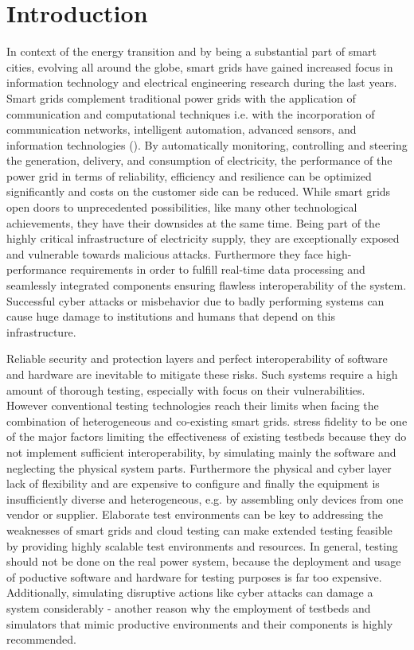 \section{Introduction}
In context of the energy transition and by being a substantial part of smart cities, evolving all around the globe, smart grids have gained increased focus in information technology and electrical engineering research during the last years. Smart grids complement traditional power grids with the application of communication and computational techniques \cite{talaat2020hybrid} i.e. with the incorporation of communication networks, intelligent automation, advanced sensors, and information technologies (\cite{smadi2021comprehensive}). By automatically monitoring, controlling and steering the generation, delivery, and consumption of electricity, the performance of the power grid in terms of reliability, efficiency and resilience can be optimized significantly and costs on the customer side can be reduced. While smart grids open doors to unprecedented possibilities, like many other technological achievements, they have their downsides at the same time. Being part of the highly critical infrastructure of electricity supply, they are exceptionally exposed and vulnerable towards malicious attacks. Furthermore they face high-performance requirements in order to fulfill real-time data processing and seamlessly integrated components ensuring flawless interoperability of the system. Successful cyber attacks or misbehavior due to badly performing systems can cause huge damage to institutions and humans that depend on this infrastructure.

Reliable security and protection layers and perfect interoperability of software and hardware are inevitable to mitigate these risks. Such systems require a high amount of thorough testing, especially with focus on their vulnerabilities. However conventional testing technologies reach their limits when facing the combination of heterogeneous and co-existing smart grids. \citeauthor{smadi2021comprehensive} stress fidelity to be one of the major factors limiting the effectiveness of existing testbeds because they do not implement sufficient interoperability, by simulating mainly the software and neglecting the physical system parts. Furthermore the physical and cyber layer lack of flexibility and are expensive to configure and finally the equipment is insufficiently diverse and heterogeneous, e.g. by assembling only devices from one vendor or supplier\cite{smadi2021comprehensive}. Elaborate test environments can be key to addressing the weaknesses of smart grids and cloud testing can make extended testing feasible by providing highly scalable test environments and resources. In general, testing should not be done on the real power system, because the deployment and usage of poductive software and hardware for testing purposes is far too expensive. Additionally, simulating disruptive actions like cyber attacks can damage a system considerably - another reason why the employment of testbeds and simulators that mimic productive environments and their components is highly recommended.

